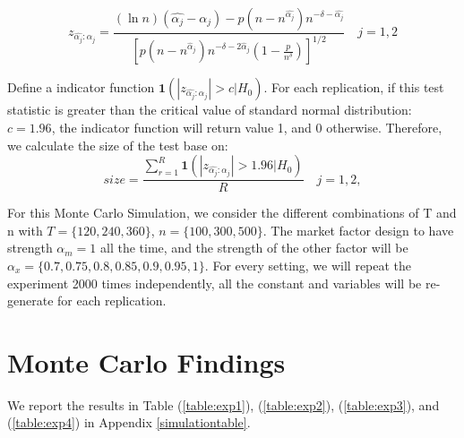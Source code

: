 	\[  z_{\hat{\alpha_j}:\alpha_j} =\frac{(\ln n)\left(\hat{\alpha_j}-\alpha_{j}\right)-p\left(n-n^{\hat{\alpha_j}}\right) n^{-\delta-\hat{\alpha_j}}}{\left[p\left(n-n^{\hat{\alpha}_j}\right) n^{-\delta-2 \hat{\alpha}_j}\left(1-\frac{p}{n^{\delta}}\right)\right]^{1 / 2}}\quad j=1,2 \tag{9}  \label{z_indicator}\]

Define a indicator function $\bm{1}(|z_{\hat{\alpha_j}:\alpha_j} |>c|H_0)$.
For each replication, if this test statistic is greater than the critical value of standard normal distribution: $c = 1.96$, the indicator function will return value 1, and 0 otherwise.
Therefore, we calculate the size of the test base on:
	\[ size = \frac{\sum_{r=1}^{R} \bm{1}(|z_{\hat{\alpha_j}:\alpha_j} |>1.96|H_0)}{R} \quad j =1,2 \tag{10}, \label{size_calculator}\]


For this Monte Carlo Simulation, we consider the different combinations of T and n with $T = \{120, 240, 360\}$, $n =\{100, 300, 500\} $.
The market factor design to have strength $\alpha_m = 1$ all the time, and the strength of the other factor will be $\alpha_{x} = \{0.7, 0.75, 0.8,0.85, 0.9,0.95, 1\}$. For every setting, we will repeat the experiment 2000 times independently, all the constant and variables will be re-generate for each replication.


 
	\section{Monte Carlo Findings}\label{MC_findings}
We report the results in Table (\ref{table:exp1}), (\ref{table:exp2}), (\ref{table:exp3}), and (\ref{table:exp4}) in Appendix \ref{simulationtable}.

